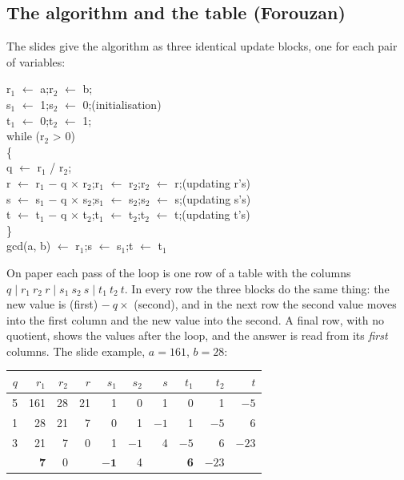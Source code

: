 \subsection{The algorithm and the table (Forouzan)}
The slides give the algorithm as three identical update blocks, one for each pair of variables:
\begin{center}
\begin{minipage}{0.62\textwidth}
\small\ttfamily
r$_1$ $\leftarrow$ a;\quad r$_2$ $\leftarrow$ b;\\
s$_1$ $\leftarrow$ 1;\quad s$_2$ $\leftarrow$ 0;\hfill\textrm{(initialisation)}\\
t$_1$ $\leftarrow$ 0;\quad t$_2$ $\leftarrow$ 1;\\
while (r$_2$ > 0)\\
\{\\
\hspace*{1.5em}q $\leftarrow$ r$_1$ / r$_2$;\\
\hspace*{1.5em}r $\leftarrow$ r$_1$ $-$ q $\times$ r$_2$;\quad r$_1$ $\leftarrow$ r$_2$;\quad r$_2$ $\leftarrow$ r;\hfill\textrm{(updating r's)}\\
\hspace*{1.5em}s $\leftarrow$ s$_1$ $-$ q $\times$ s$_2$;\quad s$_1$ $\leftarrow$ s$_2$;\quad s$_2$ $\leftarrow$ s;\hfill\textrm{(updating s's)}\\
\hspace*{1.5em}t $\leftarrow$ t$_1$ $-$ q $\times$ t$_2$;\quad t$_1$ $\leftarrow$ t$_2$;\quad t$_2$ $\leftarrow$ t;\hfill\textrm{(updating t's)}\\
\}\\
gcd(a, b) $\leftarrow$ r$_1$;\quad s $\leftarrow$ s$_1$;\quad t $\leftarrow$ t$_1$
\end{minipage}
\end{center}
On paper each pass of the loop is one row of a table with the columns $q \mid r_1\ r_2\ r \mid s_1\ s_2\ s \mid t_1\ t_2\ t$. In every row the three blocks do the same thing: the new value is (first) $-\ q \times$ (second), and in the next row the second value moves into the first column and the new value into the second. A final row, with no quotient, shows the values after the loop, and the answer is read from its \emph{first} columns. The slide example, $a = 161$, $b = 28$:
\begin{center}\small
\begin{tabular}{@{}r|rrr|rrr|rrr@{}}
\toprule
$q$ & $r_1$ & $r_2$ & $r$ & $s_1$ & $s_2$ & $s$ & $t_1$ & $t_2$ & $t$\\
\midrule
5 & 161 & 28 & 21 & 1 & 0 & 1 & 0 & 1 & $-5$\\
1 & 28 & 21 & 7 & 0 & 1 & $-1$ & 1 & $-5$ & 6\\
3 & 21 & 7 & 0 & 1 & $-1$ & 4 & $-5$ & 6 & $-23$\\
 & \textbf{7} & 0 & & $\mathbf{-1}$ & 4 & & \textbf{6} & $-23$ & \\
\bottomrule
\end{tabular}
\end{center}
